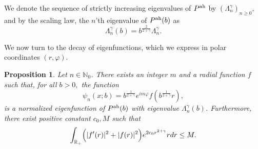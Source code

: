 \documentclass[11pt]{amsart}
\newtheorem{proposition}[theorem]{Proposition}
\theoremstyle{remark}
\newcommand{\R}{\mathbb{R}}
\numberwithin{equation}{section}
\begin{document}
We denote the sequence of strictly increasing eigenvalues of $P^{\rm ah}$ by $(\Lambda_n^\gamma)_{n\geq 0}$, and by the scaling law, the $n$'th eigenvalue of $P^{\rm ah}(b)$ as
\[\Lambda_n^\gamma(b)=b^{\frac{2}{2+\gamma}}\Lambda_n^\gamma.\]

We now turn to the decay of eigenfunctions, which we express in polar coordinates $(r,\varphi)$.

\begin{proposition}\label{label:dec-ef-ah}
Let $n\in\mathbb N_0$.  There exists an integer $m$ and a radial function $f$ such that, for all $b>0,$ the function
\[\psi_n(x;b)=b^{\frac{1}{2+\gamma}} e^{i m\varphi}f(b^{\frac{1}{2+\gamma}}r),\]
is a normalized eigenfunction of $P^{\rm ah}(b)$ with eigenvalue $\Lambda_n^\gamma(b)$. Furthermore, there exist positive constant $c_0,M$ such that 
\[\int_{\R_+}\Bigl(|f'(r)|^2+ |f(r)|^2\Bigr)e^{2c_0r^{2+\gamma} }rdr\leq M.\]
\end{proposition}
\end{document}
